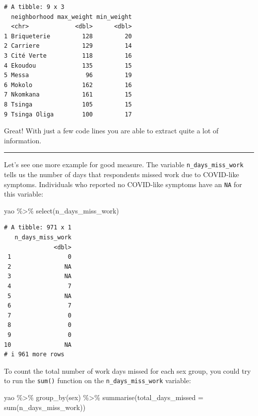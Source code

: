 \documentclass[
  letterpaper,
  DIV=11,
  numbers=noendperiod]{scrreprt}
\newenvironment{Shaded}{\begin{snugshade}}{\end{snugshade}}
\newcommand{\AttributeTok}[1]{\textcolor[rgb]{0.40,0.45,0.13}{#1}}
\newcommand{\FunctionTok}[1]{\textcolor[rgb]{0.28,0.35,0.67}{#1}}
\newcommand{\NormalTok}[1]{\textcolor[rgb]{0.00,0.23,0.31}{#1}}
\newcommand{\SpecialCharTok}[1]{\textcolor[rgb]{0.37,0.37,0.37}{#1}}
\begin{document}
\begin{verbatim}
# A tibble: 9 x 3
  neighborhood max_weight min_weight
  <chr>             <dbl>      <dbl>
1 Briqueterie         128         20
2 Carriere            129         14
3 Cité Verte          118         16
4 Ekoudou             135         15
5 Messa                96         19
6 Mokolo              162         16
7 Nkomkana            161         15
8 Tsinga              105         15
9 Tsinga Oliga        100         17
\end{verbatim}

Great! With just a few code lines you are able to extract quite a lot of
information.

\begin{center}\rule{0.5\linewidth}{0.5pt}\end{center}

Let's see one more example for good measure. The variable
\texttt{n\_days\_miss\_work} tells us the number of days that
respondents missed work due to COVID-like symptoms. Individuals who
reported no COVID-like symptoms have an \texttt{NA} for this variable:

\begin{Shaded}
\begin{Highlighting}[]
\NormalTok{yao }\SpecialCharTok{\%\textgreater{}\%} 
  \FunctionTok{select}\NormalTok{(n\_days\_miss\_work)}
\end{Highlighting}
\end{Shaded}

\begin{verbatim}
# A tibble: 971 x 1
   n_days_miss_work
              <dbl>
 1                0
 2               NA
 3               NA
 4                7
 5               NA
 6                7
 7                0
 8                0
 9                0
10               NA
# i 961 more rows
\end{verbatim}

To count the total number of work days missed for each sex group, you
could try to run the \texttt{sum()} function on the
\texttt{n\_days\_miss\_work} variable:

\begin{Shaded}
\begin{Highlighting}[]
\NormalTok{yao }\SpecialCharTok{\%\textgreater{}\%} 
  \FunctionTok{group\_by}\NormalTok{(sex) }\SpecialCharTok{\%\textgreater{}\%} 
  \FunctionTok{summarise}\NormalTok{(}\AttributeTok{total\_days\_missed =} \FunctionTok{sum}\NormalTok{(n\_days\_miss\_work))}
\end{Highlighting}
\end{Shaded}
\end{document}
